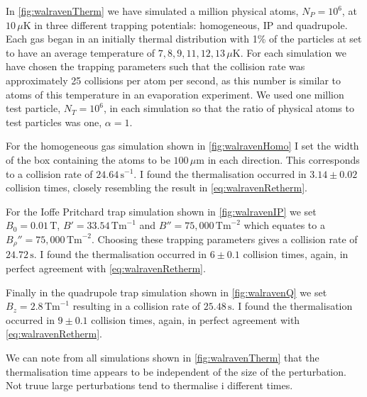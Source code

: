 In \autoref{fig:walravenTherm} we have simulated a million physical atoms, $N_P=10^6$, at $10\,\mu \mathrm{K}$ in three different trapping potentials: homogeneous, IP and quadrupole. 
Each gas began in an initially thermal distribution with 1\% of the particles at set to have an average temperature of $7,8,9,11,12,13\,\mu\mathrm{K}$.
For each simulation we have chosen the trapping parameters such that the collision rate was approximately 25 collisions per atom per second, as this number is similar to atoms of this temperature in an evaporation experiment.
We used one million test particle, $N_T=10^6$, in each simulation so that the ratio of physical atoms to test particles was one, $\alpha=1$.

For the homogeneous gas simulation shown in \autoref{fig:walravenHomo} I set the width of the box containing the atoms to be $100\,\mu \mathrm{m}$ in each direction. 
This corresponds to a collision rate of $24.64\,\mathrm{s}^{-1}$.
I found the thermalisation occurred in $3.14\pm 0.02$ collision times, closely resembling the result in \autoref{eq:walravenRetherm}.

For the Ioffe Pritchard trap simulation shown in \autoref{fig:walravenIP} we set $B_0=0.01\,\mathrm{T}$, $B'=33.54\,\mathrm{Tm}^{-1}$ and $B''=75,000\,\mathrm{Tm}^{-2}$ which equates to a ${B_{\rho}}''=75,000\,\mathrm{Tm}^{-2}$. 
Choosing these trapping parameters gives a collision rate of $24.72\,\mathrm{s}$.
I found the thermalisation occurred in $6\pm 0.1$ collision times, again, in perfect agreement with \autoref{eq:walravenRetherm}.

Finally in the quadrupole trap simulation shown in \autoref{fig:walravenQ} we set $B_z=2.8\,\mathrm{Tm}^{-1}$ resulting in a collision rate of $25.48\,\mathrm{s}$.
I found the thermalisation occurred in $9\pm 0.1$ collision times, again, in perfect agreement with \autoref{eq:walravenRetherm}.

We can note from all simulations shown in \autoref{fig:walravenTherm} that the thermalisation time appears to be independent of the size of the perturbation. 
Not truue large perturbations tend to thermalise i different times.


